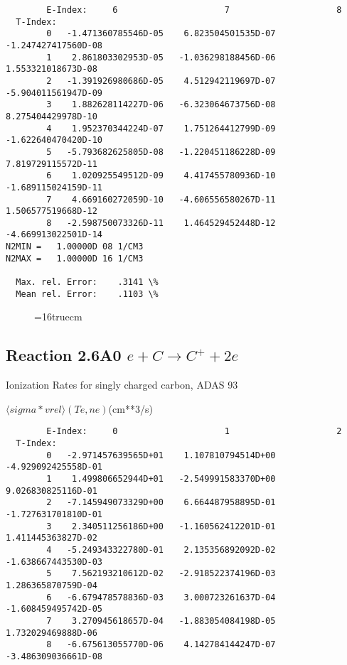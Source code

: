 \documentclass[12pt,dvipdfmx]{article}
\begin{document}
{\begin{small}
\begin{verbatim}
        E-Index:     6                     7                     8
  T-Index:
        0   -1.471360785546D-05    6.823504501535D-07   -1.247427417560D-08
        1    2.861803302953D-05   -1.036298188456D-06    1.553321018673D-08
        2   -1.391926980686D-05    4.512942119697D-07   -5.904011561947D-09
        3    1.882628114227D-06   -6.323064673756D-08    8.275404429978D-10
        4    1.952370344224D-07    1.751264412799D-09   -1.622640470420D-10
        5   -5.793682625805D-08   -1.220451186228D-09    7.819729115572D-11
        6    1.020925549512D-09    4.417455780936D-10   -1.689115024159D-11
        7    4.669160272059D-10   -4.606556580267D-11    1.506577519668D-12
        8   -2.598750073326D-11    1.464529452448D-12   -4.669913022501D-14
N2MIN =   1.00000D 08 1/CM3
N2MAX =   1.00000D 16 1/CM3

  Max. rel. Error:    .3141 \%
  Mean rel. Error:    .1103 \%

\end{verbatim}\end{small}
\begin{figure} \label{2.2C}
\epsfxsize=16truecm
\end{figure}
\newpage


\subsection{
Reaction 2.6A0 $e + C \rightarrow C^+  + 2e $
}
  Ionization Rates for singly charged carbon,
  ADAS 93

$  \langle sigma*vrel \rangle(Te,ne) $(cm**3/s)
\begin{small}\begin{verbatim}
        E-Index:     0                     1                     2
  T-Index:
        0   -2.971457639565D+01    1.107810794514D+00   -4.929092425558D-01
        1    1.499806652944D+01   -2.549991583370D+00    9.026830825116D-01
        2   -7.145949073329D+00    6.664487958895D-01   -1.727631701810D-01
        3    2.340511256186D+00   -1.160562412201D-01    1.411445363827D-02
        4   -5.249343322780D-01    2.135356892092D-02   -1.638667443530D-03
        5    7.562193210612D-02   -2.918522374196D-03    1.286365870759D-04
        6   -6.679478578836D-03    3.000723261637D-04   -1.608459495742D-05
        7    3.270945618657D-04   -1.883054084198D-05    1.732029469888D-06
        8   -6.675613055770D-06    4.142784144247D-07   -3.486309036661D-08


\end{verbatim}
\end{small}}
\end{document}
